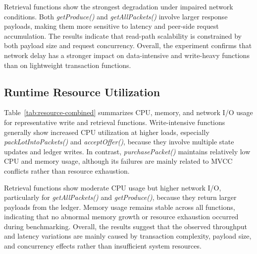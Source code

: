 \documentclass[manuscript,screen,nofonts]{acmart}
\begin{document}
Retrieval functions show the strongest degradation under impaired network conditions. Both \textit{getProduce()} and \textit{getAllPackets()} involve larger response payloads, making them more sensitive to latency and peer-side request accumulation. The results indicate that read-path scalability is constrained by both payload size and request concurrency. Overall, the experiment confirms that network delay has a stronger impact on data-intensive and write-heavy functions than on lightweight transaction functions.
\subsection{Runtime Resource Utilization}

Table~\ref{tab:resource-combined} summarizes CPU, memory, and network I/O usage for representative write and retrieval functions. Write-intensive functions generally show increased CPU utilization at higher loads, especially \textit{packLotIntoPackets()} and \textit{acceptOffer()}, because they involve multiple state updates and ledger writes. In contrast, \textit{purchasePacket()} maintains relatively low CPU and memory usage, although its failures are mainly related to MVCC conflicts rather than resource exhaustion.

Retrieval functions show moderate CPU usage but higher network I/O, particularly for \textit{getAllPackets()} and \textit{getProduce()}, because they return larger payloads from the ledger. Memory usage remains stable across all functions, indicating that no abnormal memory growth or resource exhaustion occurred during benchmarking. Overall, the results suggest that the observed throughput and latency variations are mainly caused by transaction complexity, payload size, and concurrency effects rather than insufficient system resources.
\end{document}
